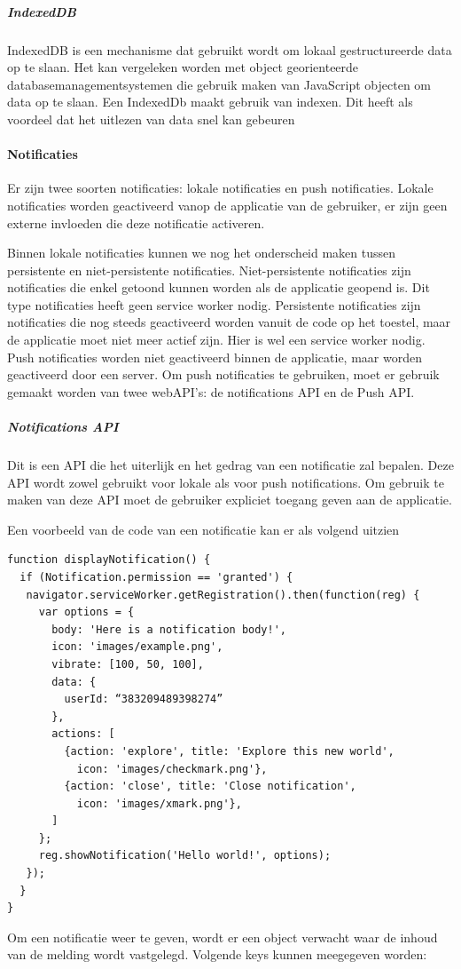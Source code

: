 			\subparagraph{IndexedDB}

				IndexedDB is een mechanisme dat gebruikt wordt om lokaal gestructureerde data op te slaan. Het kan vergeleken worden met object georienteerde databasemanagementsystemen die gebruik maken van JavaScript objecten om data op te slaan. Een IndexedDb maakt gebruik van indexen. Dit heeft als voordeel dat het uitlezen van data snel kan gebeuren
				\autocite{Mozilla2019}
	
	
	\paragraph{Notificaties}
	
		Er zijn twee soorten notificaties: lokale notificaties en push notificaties. 
		Lokale notificaties worden geactiveerd vanop de applicatie van de gebruiker, er zijn geen externe invloeden die deze notificatie activeren.
		
		Binnen lokale notificaties kunnen we nog het onderscheid maken tussen persistente en niet-persistente notificaties.
		Niet-persistente notificaties zijn notificaties die enkel getoond kunnen worden als de applicatie geopend is. Dit type notificaties heeft geen service worker nodig. 
		Persistente notificaties zijn notificaties die nog steeds geactiveerd worden vanuit de code op het toestel, maar de applicatie moet niet meer actief zijn. Hier is wel een service worker nodig.
		{\tiny }
		Push notificaties worden niet geactiveerd binnen de applicatie, maar worden geactiveerd door een server.
		Om push notificaties te gebruiken, moet er gebruik gemaakt worden van twee webAPI’s: de notifications API en de Push API.
		
		\subparagraph{Notifications API}
			Dit is een API die het uiterlijk en het gedrag van een notificatie zal bepalen. Deze API wordt zowel gebruikt voor lokale als voor push notifications.
			Om gebruik te maken van deze API moet de gebruiker expliciet toegang geven aan de applicatie.
			
			Een voorbeeld van de code van een notificatie kan er als volgend uitzien
		
\begin{lstlisting}
function displayNotification() {
  if (Notification.permission == 'granted') {
   navigator.serviceWorker.getRegistration().then(function(reg) {
     var options = {
       body: 'Here is a notification body!',
       icon: 'images/example.png',
       vibrate: [100, 50, 100],
       data: {
         userId: “383209489398274”
       },
       actions: [
         {action: 'explore', title: 'Explore this new world',
           icon: 'images/checkmark.png'},
         {action: 'close', title: 'Close notification',
           icon: 'images/xmark.png'},
       ]
     };
     reg.showNotification('Hello world!', options);
   });
  }
}
\end{lstlisting}
			Om een notificatie weer te geven, wordt er een object verwacht waar de inhoud van de melding wordt vastgelegd. Volgende keys kunnen meegegeven worden:
			
